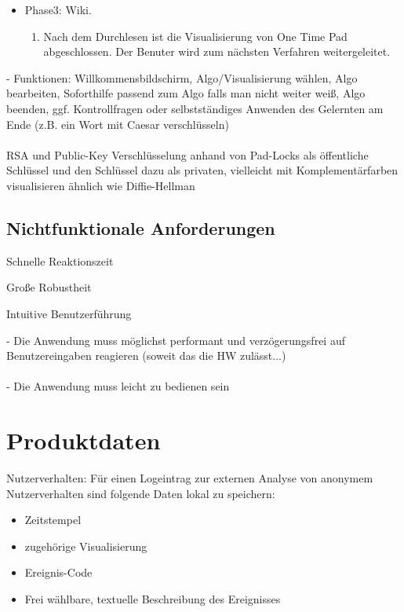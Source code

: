 \documentclass{article}
\begin{document}
\begin{itemize}[label={}]
\item Phase3: Wiki.
\begin{enumerate}
\item Nach dem Durchlesen ist die Visualisierung von One Time Pad abgeschlossen. Der Benuter wird zum nächsten Verfahren weitergeleitet.
\end{enumerate}
\end{itemize}

- Funktionen: Willkommensbildschirm, Algo/Visualisierung wählen, Algo bearbeiten,
Soforthilfe passend zum Algo falls man nicht weiter weiß, Algo beenden,
ggf. Kontrollfragen oder selbstständiges Anwenden des Gelernten am Ende (z.B. ein Wort mit Caesar verschlüsseln)
\\
\\
RSA und Public-Key Verschlüsselung anhand von Pad-Locks als
öffentliche Schlüssel und den Schlüssel  dazu als privaten,
vielleicht mit Komplementärfarben visualisieren ähnlich wie Diffie-Hellman



\subsection{Nichtfunktionale Anforderungen}

\begin{NA}[start=100]
\item Schnelle Reaktionszeit
\end{NA}
\begin{NA}[start=200]
\item Große Robustheit
\end{NA}
\begin{NA}[start=300]
\item Intuitive Benutzerführung
\end{NA}

- Die Anwendung muss möglichst performant und verzögerungsfrei auf Benutzereingaben reagieren (soweit das die HW zulässt...)
\\
\\
- Die Anwendung muss leicht zu bedienen sein

\section{Produktdaten}
\begin{PD}[start=10]
  \item Nutzerverhalten: Für einen Logeintrag zur externen Analyse von anonymem Nutzerverhalten sind folgende Daten lokal zu speichern:
  \begin{itemize}
    \item Zeitstempel
    \item zugehörige Visualisierung
    \item Ereignis-Code
    \item Frei wählbare, textuelle Beschreibung des Ereignisses
  \end{itemize}
\end{PD}
\end{document}
